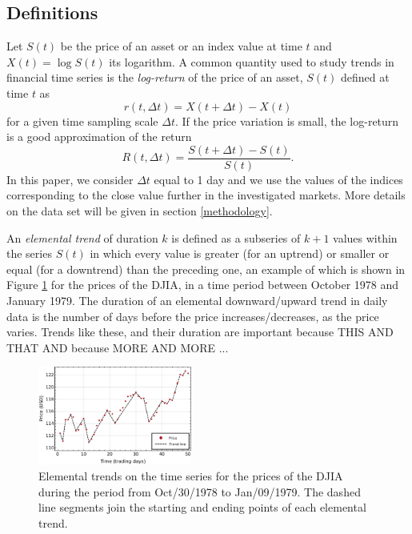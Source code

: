 \documentclass[a4paper]{jpconf}
\begin{document}
\subsection{Definitions} 
\label{def}
Let $S(t)$ be the price of an asset or an index value at time $t$ and $X(t) = \log{S(t)}$ its logarithm. A common quantity used to study trends in financial time series is the \emph{log-return} of the price of an asset, $S(t)$ defined at time $t$ as
\begin{equation}
r(t,\Delta{t}) = X(t + \Delta{t}) - X(t)
\end{equation}
for a given time sampling scale $\Delta{t}$. If the price variation is small, the log-return is a good approximation of the return
\begin{equation}
R(t,\Delta t) = \frac{S(t+\Delta t) - S(t)}{S(t)}.
\end{equation}
In this paper, we consider $\Delta t$ equal to 1 day and we use the values of the indices corresponding to the close value further in the investigated markets. More details on the data set will be given in section \ref{methodology}.

An \emph{elemental trend} of duration $k$ is defined as a subseries of $k+1$ values within the series $S(t)$ in which every value is greater (for an uptrend) or smaller or equal (for a downtrend) than the preceding one, an example of which is shown in Figure \ref{fig:trends} for the prices of the DJIA, in a time period between October 1978 and January 1979. The duration of an elemental downward/upward trend in daily data is the number of days before the price increases/decreases, as the price varies. Trends like these, and their duration are important because THIS AND THAT AND because MORE AND MORE ...

\begin{figure}[htb!]
\begin{center}
\includegraphics[width=0.45\textwidth]{img/TrendReturnsVisual.pdf}
\end{center}
\caption{\small \label{fig:trends}Elemental trends on the time series for the prices of the DJIA during the period from Oct/30/1978 to Jan/09/1979. The dashed line segments join the starting and ending points of each elemental trend.}
\end{figure}
\end{document}
